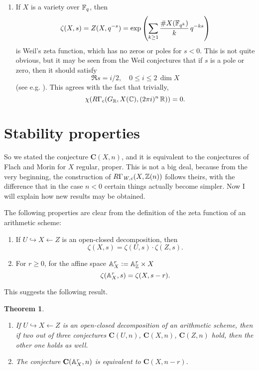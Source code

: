 \documentclass{article}
\theoremstyle{plain}
\newtheorem*{theorem*}{Theorem}
\begin{document}
\begin{enumerate}
\item[2)] If $X$ is a variety over $\FF_q$, then
  $$\zeta (X,s) = Z (X, q^{-s}) = \exp \left(\sum_{k\ge 1} \frac{\# X (\FF_{q^k})}{k}\,q^{-ks}\right)$$
  is Weil's zeta function, which has no zeros or poles for $s < 0$. This is not
  quite obvious, but it may be seen from the Weil conjectures that if $s$ is a
  pole or zero, then it should satisfy
  $$\Re s = i/2, \quad 0 \le i \le 2\,\dim X$$
  (see e.g. \cite[p. 26--27]{Katz-Motives}). This agrees with the fact that
  trivially,
  $$\chi (R\Gamma_c (G_\RR, X (\CC), (2\pi i)^n\,\RR)) = 0.$$
\end{enumerate}


\section{Stability properties}

So we stated the conjecture $\mathbf{C} (X,n)$, and it is equivalent to the
conjectures of Flach and Morin for $X$ regular, proper. This is not a big deal,
because from the very beginning, the construction of
$R\Gamma_\text{\it W,c} (X,\ZZ(n))$ follows theirs, with the difference that in
the case $n < 0$ certain things actually become simpler. Now I will explain how
new results may be obtained.

\vspace{1em}

The following properties are clear from the definition of the zeta function of
an arithmetic scheme:

\begin{enumerate}
\item[1)] If $U \hookrightarrow X \leftarrow Z$ is an open-closed decomposition,
  then
  $$\zeta (X, s) = \zeta (U, s) \cdot \zeta (Z, s).$$

\item[2)] For $r \ge 0$, for the affine space $\AA^r_X \dfn \AA_\ZZ^r \times X$
  $$\zeta (\AA^r_X, s) = \zeta (X, s - r).$$
\end{enumerate}

This suggests the following result.

\begin{theorem*}
  ~
  \begin{enumerate}
  \item[1)] If $U \hookrightarrow X \leftarrow Z$ is an open-closed
    decomposition of an arithmetic scheme, then if two out of three conjectures
    $\mathbf{C} (U, n)$, $\mathbf{C} (X, n)$, $\mathbf{C} (Z, n)$ hold, then the
    other one holds as well.

  \item[2)] The conjecture $\mathbf{C} (\AA^r_X, n)$ is equivalent to
    $\mathbf{C} (X, n-r)$.
  \end{enumerate}
\end{theorem*}
\end{document}
